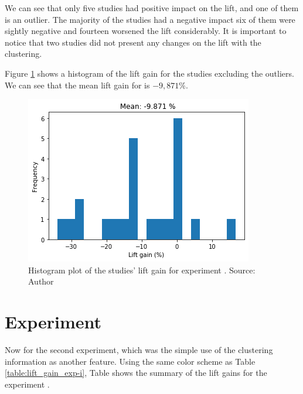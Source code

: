We can see that only five studies had positive impact on the lift, and one of them is an outlier. The majority of the studies had a negative impact six of them were sightly negative and fourteen worsened the lift considerably. It is important to notice that two studies did not present any changes on the lift with the clustering.

Figure \ref{fig:lift-hist-plot-exp-i} shows a histogram of the lift gain for the studies excluding the outliers. We can see that the mean lift gain for \nameExperimentI{} is $-9,871 \%$.

\begin{figure}[h]
   \centering
   \includegraphics[width=\linewidth]{fig/ch4-lift-hist-plot-exp-i.png}
   \caption{Histogram plot of the studies' lift gain for experiment \nameExperimentI{}. Source: Author}
   \label{fig:lift-hist-plot-exp-i}
\end{figure}

\section{Experiment \nameExperimentII{}}

Now for the second experiment, which was the simple use of the clustering information as another feature. Using the same color scheme as Table \ref{table:lift_gain_exp-i}, Table \label{table:lift_gain_exp-ii} shows the summary of the lift gains for the experiment \nameExperimentII{}.

